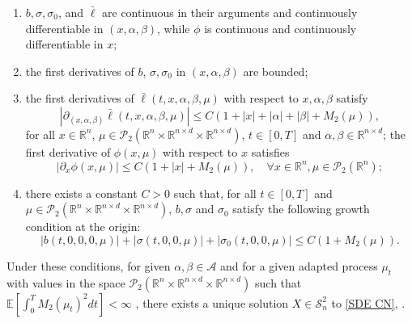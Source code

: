 \documentclass[11pt,a4paper]{article}
\begin{document}
\begin{enumerate}[label= (A\arabic*)]
\item $b, \sigma, \sigma_0$, and $\bar{\ell}$ are continuous in their arguments and continuously differentiable in $(x, \alpha, \beta)$, while $\phi$ is continuous and continuously differentiable in $x$;
\item the first  derivatives of $b$, $\sigma, \sigma_0$ in $(x, \alpha, \beta)$ are bounded;
\item the first derivatives of \( \bar{\ell}(t, x, \alpha, \beta, \mu) \) with respect to \( x, \alpha, \beta \) satisfy 
\[
|\partial_{(x,\alpha,\beta)} \bar{\ell}(t, x, \alpha, \beta, \mu)| \leq C \left(1 + |x| + |\alpha| + |\beta| + M_2(\mu)\right), 
\]
for all $ x \in \mathbb{R}^n$, $\mu \in \mathcal{P}_2(\mathbb R^n \times \mathbb R^{n\times d} \times \mathbb R^{n\times d})$, $t \in [0,T]$ and $\alpha, \beta \in \mathbb{R}^{n \times d}$;
the first derivative of \( \phi(x, \mu) \) with respect to \( x \) satisfies
\[
|\partial_x \phi(x, \mu)| \leq C \left(1 + |x| + M_2(\mu)\right), \quad \forall x \in \mathbb{R}^n, \mu \in \mathcal{P}_2(\mathbb R^n );
\]
\item[(A4)] there exists a constant $C > 0$ such that, for all $t \in [0,T]$ and $\mu \in \mathcal{P}_2(\mathbb R^n \times \mathbb R^{n\times d} \times \mathbb R^{n\times d})$, $b, \sigma$ and $\sigma_0$ satisfy the following growth condition at the origin:
\[
|b(t,0,0,0,\mu)| + |\sigma(t,0,0,\mu)| + |\sigma_0(t,0,0,\mu)| \leq C(1 + M_2(\mu)).
\]
\end{enumerate}
Under these conditions, for given $\alpha, \beta \in \mathcal{A}$ and for a given adapted process $\mu_t$ with values  in the space $\mathcal{P}_2(\mathbb R^n \times \mathbb R^{n\times d} \times \mathbb R^{n\times d})$ such that $\mathbb E \left[\int_0^T M_2(\mu_t)^2 dt\right]<\infty$ , there exists a unique solution  $X \in \mathcal S^2 _n$ to \eqref{SDE CN}, \cite[Theorem 6.16, p.49]{Yong Zhou}.
\end{document}
